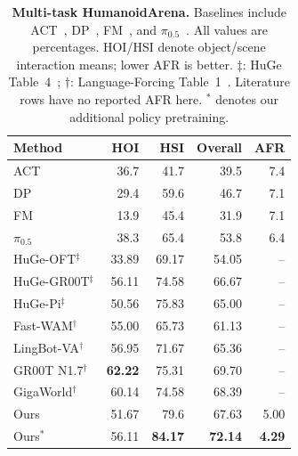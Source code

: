 \begin{table}[t]
\centering\small
\caption{\textbf{Multi-task HumanoidArena.} Baselines include ACT~\cite{ACT}, DP~\cite{chi2023diffusionpolicy}, FM~\cite{FM_objective}, and $\pi_{0.5}$~\cite{pi05}. All values are percentages. HOI/HSI denote object/scene interaction means; lower AFR is better. $\ddagger$: HuGe Table~4~\cite{liu2026huge}; $\dagger$: Language-Forcing Table~1~\cite{li2026languageforcing}. Literature rows have no reported AFR here. $^{*}$ denotes our additional policy pretraining.}
\label{tab:arena_summary}
\setlength{\tabcolsep}{3.3pt}
\begin{tabular}{lrrrr}\toprule
Method & HOI & HSI & Overall & AFR\\\midrule
ACT &36.7&41.7&39.5&7.4\\
DP &29.4&59.6&46.7&7.1\\
FM &13.9&45.4&31.9&7.1\\
$\pi_{0.5}$ &38.3&65.4&53.8&6.4\\
HuGe-OFT$^{\ddagger}$ &33.89&69.17&54.05&--\\
HuGe-GR00T$^{\ddagger}$ &56.11&74.58&66.67&--\\
HuGe-Pi$^{\ddagger}$ &50.56&75.83&65.00&--\\
Fast-WAM$^{\dagger}$ &55.00&65.73&61.13&--\\
LingBot-VA$^{\dagger}$ &56.95&71.67&65.36&--\\
GR00T N1.7$^{\dagger}$ &\textbf{62.22}&75.31&69.70&--\\
GigaWorld$^{\dagger}$ &60.14&74.58&68.39&--\\\midrule
Ours &51.67&79.6&67.63&5.00\\
Ours$^{*}$ &56.11&\textbf{84.17}&\textbf{72.14}&\textbf{4.29}\\\bottomrule
\end{tabular}
\end{table}
